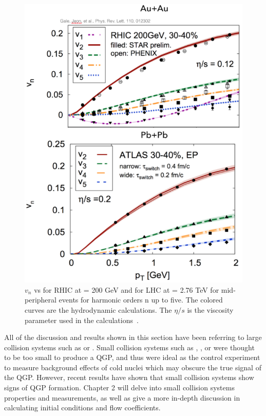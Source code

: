 \begin{figure}[!ht]
\centering
\includegraphics[width=0.65\linewidth]{figs/vn_aa_pbpb_hydro.PNG}
\caption{$v_n$ vs \pt for RHIC \auau at \sqsn = 200 GeV and for LHC \pbpb at \sqsn = 2.76 TeV for mid-peripheral events for harmonic orders n up to five. The colored curves are the hydrodynamic calculations. The $\eta/s$ is the viscosity parameter used in the calculations~\cite{PhysRevLett.110.012302}.}
\label{fig:vn_aa_hydro}
\end{figure}

All of the discussion and results shown in this section have been referring to large collision systems such as \auau or \pbpb. Small collision systems such as \pa, \dau, or \pp were thought to be too small to produce a QGP, and thus were ideal as the control experiment to measure background effects of cold nuclei which may obscure the true signal of the QGP. However, recent results have shown that small collision systems show signs of QGP formation. Chapter 2 will delve into small collision systems properties and measurements, as well as give a more in-depth discussion in calculating initial conditions and flow coefficients.

